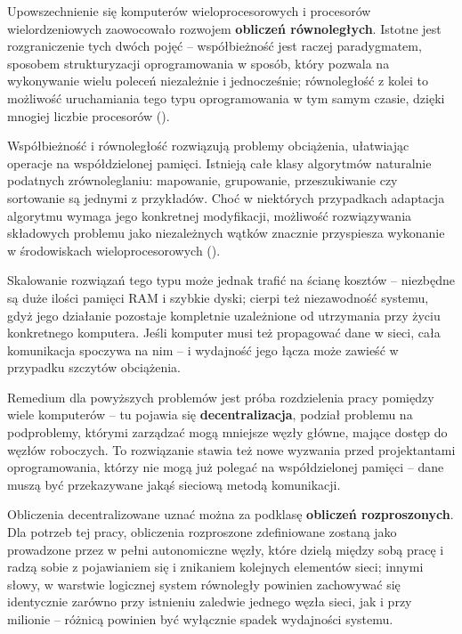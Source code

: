 Upowszechnienie się komputerów wieloprocesorowych i procesorów wielordzeniowych zaowocowało rozwojem \textbf{obliczeń równoległych}. Istotne jest rozgraniczenie tych dwóch pojęć -- współbieżność jest raczej paradygmatem, sposobem strukturyzacji oprogramowania w sposób, który pozwala na wykonywanie wielu poleceń niezależnie i jednocześnie; równoległość z kolei to możliwość uruchamiania tego typu oprogramowania w tym samym czasie, dzięki mnogiej liczbie procesorów (\cite{concurrencyGo}).

Współbieżność i równoległość rozwiązują problemy obciążenia, ułatwiając operacje na współdzielonej pamięci. Istnieją całe klasy algorytmów naturalnie podatnych zrównoleglaniu: mapowanie, grupowanie, przeszukiwanie czy sortowanie są jednymi z przykładów. Choć w niektórych przypadkach adaptacja algorytmu wymaga jego konkretnej modyfikacji, możliwość rozwiązywania składowych problemu jako niezależnych wątków znacznie przyspiesza wykonanie w środowiskach wieloprocesorowych (\cite{parallelAlgo}).

Skalowanie rozwiązań tego typu może jednak trafić na ścianę kosztów -- niezbędne są duże ilości pamięci RAM i szybkie dyski; cierpi też niezawodność systemu, gdyż jego działanie pozostaje kompletnie uzależnione od utrzymania przy życiu konkretnego komputera. Jeśli komputer musi też propagować dane w sieci, cała komunikacja spoczywa na nim -- i wydajność jego łącza może zawieść w przypadku szczytów obciążenia.

Remedium dla powyższych problemów jest próba rozdzielenia pracy pomiędzy wiele komputerów -- tu pojawia się \textbf{decentralizacja}, podział problemu na podproblemy, którymi zarządzać mogą mniejsze węzły główne, mające dostęp do węzłów roboczych. To rozwiązanie stawia też nowe wyzwania przed projektantami oprogramowania, którzy nie mogą już polegać na współdzielonej pamięci -- dane muszą być przekazywane jakąś sieciową metodą komunikacji.



Obliczenia decentralizowane uznać można za podklasę \textbf{obliczeń rozproszonych}. Dla potrzeb tej pracy, obliczenia rozproszone zdefiniowane zostaną jako prowadzone przez w pełni autonomiczne węzły, które dzielą między sobą pracę i radzą sobie z pojawianiem się i znikaniem kolejnych elementów sieci; innymi słowy, w warstwie logicznej system równoległy powinien zachowywać się identycznie zarówno przy istnieniu zaledwie jednego węzła sieci, jak i przy milionie -- różnicą powinien być wyłącznie spadek wydajności systemu.

